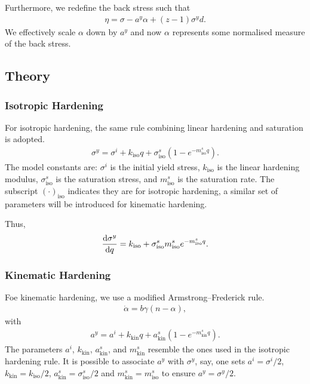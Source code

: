 Furthermore, we redefine the back stress such that
\begin{gather}
\eta=\sigma-a^y\alpha+\left(z-1\right)\sigma^yd.
\end{gather}
We effectively scale $\alpha$ down by $a^y$ and now $\alpha$ represents some normalised measure of the back stress.
\subsection{Theory}
\subsubsection{Isotropic Hardening}
For isotropic hardening, the same rule combining linear hardening and saturation is adopted.
\begin{gather}
    \sigma^y=\sigma^i+k_\text{iso}q+\sigma^s_\text{iso}\left(1-e^{-m^s_\text{iso}q}\right).
\end{gather}
The model constants are: $\sigma^i$ is the initial yield stress, $k_\text{iso}$ is the linear hardening modulus, $\sigma^s_\text{iso}$ is the saturation stress, and $m^s_\text{iso}$ is the saturation rate.
The subscript $\left(\cdot\right)_\text{iso}$ indicates they are for isotropic hardening, a similar set of parameters will be introduced for kinematic hardening.

Thus,
\begin{gather}
\dfrac{\mathrm{d}\sigma^y}{\mathrm{d}q}=k_\text{iso}+\sigma^s_\text{iso}m^s_\text{iso}e^{-m^s_\text{iso}q}.
\end{gather}
\subsubsection{Kinematic Hardening}
Foe kinematic hardening, we use a modified Armstrong--Frederick rule.
\begin{gather}
    \dot{\alpha}=b\gamma\left(n-\alpha\right),
\end{gather}
with
\begin{gather}
    a^y=a^i+k_\text{kin}q+a^s_\text{kin}\left(1-e^{-m^s_\text{kin}q}\right).
\end{gather}
The parameters $a^i$, $k_\text{kin}$, $a^s_\text{kin}$, and $m^s_\text{kin}$ resemble the ones used in the isotropic hardening rule.
It is possible to associate $a^y$ with $\sigma^y$, say, one sets $a^i=\sigma^i/2$, $k_\text{kin}=k_\text{iso}/2$, $a^s_\text{kin}=\sigma^s_\text{iso}/2$ and $m^s_\text{kin}=m^s_\text{iso}$ to ensure $a^y=\sigma^y/2$.

